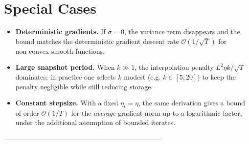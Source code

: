\documentclass{article}
\begin{document}
\section*{Special Cases}
\begin{itemize}
\item \textbf{Deterministic gradients.} If $\sigma=0$, the variance term disappears and the bound matches the deterministic gradient descent rate $\mathcal{O}(1/\sqrt{T})$ for non‑convex smooth functions.
\item \textbf{Large snapshot period.} When $k\gg1$, the interpolation penalty $L^{2}\eta k/\sqrt{T}$ dominates; in practice one selects $k$ modest (e.g. $k\in[5,20]$) to keep the penalty negligible while still reducing storage.
\item \textbf{Constant stepsize.} With a fixed $\eta_t=\eta$, the same derivation gives a bound of order $\mathcal{O}(1/T)$ for the \emph{average} gradient norm up to a logarithmic factor, under the additional assumption of bounded iterates.
\end{itemize}

---------------------------------------------------------------------
\end{document}

